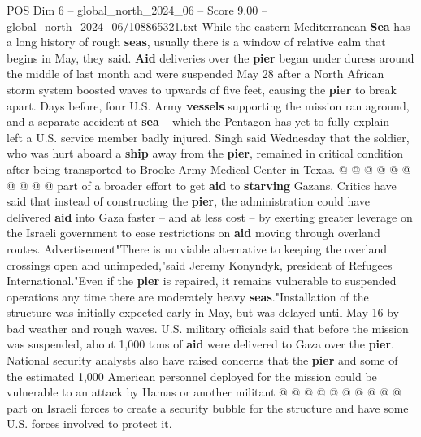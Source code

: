 \begin{textsample}{POS Dim 6 – global\_north\_2024\_06 – Score 9.00 – global\_north\_2024\_06/108865321.txt}
While the eastern Mediterranean \textbf{Sea} has a long history of rough \textbf{seas}, usually there is a window of relative calm that begins in May, they said. \textbf{Aid} deliveries over the \textbf{pier} began under duress around the middle of last month and were suspended May 28 after a North African storm system boosted waves to upwards of five feet, causing the \textbf{pier} to break apart.
Days before, four U.S.
Army \textbf{vessels} supporting the mission ran aground, and a separate accident at \textbf{sea} -- which the Pentagon has yet to fully explain -- left a U.S. service member badly injured.
Singh said Wednesday that the soldier, who was hurt aboard a \textbf{ship} away from the \textbf{pier}, remained in critical condition after being transported to Brooke Army Medical Center in Texas. @ @ @ @ @ @ @ @ @ @ part of a broader effort to get \textbf{aid} to \textbf{starving} Gazans.
Critics have said that instead of constructing the \textbf{pier}, the administration could have delivered \textbf{aid} into Gaza faster -- and at less cost -- by exerting greater leverage on the Israeli government to ease restrictions on \textbf{aid} moving through overland routes.
Advertisement"There is no viable alternative to keeping the overland crossings open and unimpeded,"said Jeremy Konyndyk, president of Refugees International."Even if the \textbf{pier} is repaired, it remains vulnerable to suspended operations any time there are moderately heavy \textbf{seas}."Installation of the structure was initially expected early in May, but was delayed until May 16 by bad weather and rough waves.
U.S. military officials said that before the mission was suspended, about 1,000 tons of \textbf{aid} were delivered to Gaza over the \textbf{pier}.
National security analysts also have raised concerns that the \textbf{pier} and some of the estimated 1,000 American personnel deployed for the mission could be vulnerable to an attack by Hamas or another militant @ @ @ @ @ @ @ @ @ @ part on Israeli forces to create a security bubble for the structure and have some U.S. forces involved to protect it.

\end{textsample}
